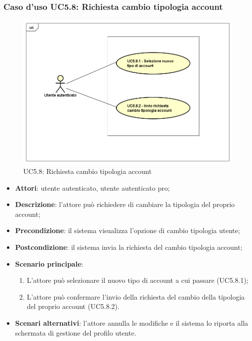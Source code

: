 \subsubsection{Caso d'uso UC5.8: Richiesta cambio tipologia account}
\label{UC5.8}
\begin{figure}[h]
	\centering
	\includegraphics[scale=0.5,keepaspectratio]{UML/UC5_8.png}
	\caption{UC5.8: Richiesta cambio tipologia account}
\end{figure}

\begin{itemize}
	\item \textbf{Attori}: utente autenticato, utente autenticato pro;
	\item \textbf{Descrizione}: l'attore può richiedere di cambiare la tipologia del proprio account; 
	\item \textbf{Precondizione}: il sistema visualizza l'opzione di cambio tipologia utente;
	\item \textbf{Postcondizione}: il sistema invia la richiesta del cambio tipologia account;
	\item \textbf{Scenario principale}:
	\begin{enumerate}
		\item L'attore può selezionare il nuovo tipo di account a cui passare (UC5.8.1);
		\item L'attore può confermare l'invio della richiesta del cambio della tipologia del proprio account (UC5.8.2).
	\end{enumerate}
	\item \textbf{Scenari alternativi}: l'attore annulla le modifiche e il sistema lo riporta alla schermata di gestione del profilo utente.
\end{itemize}

